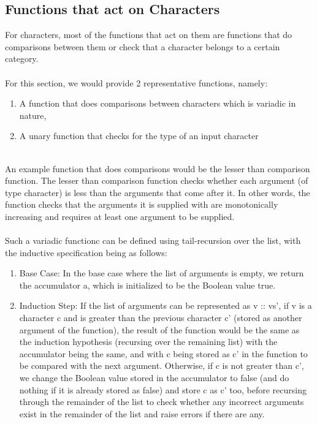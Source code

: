 \subsection{Functions that act on Characters}
For characters, most of the functions that act on them are functions that do comparisons between them or check that a character belongs to a certain category. 
\\
\\
For this section, we would provide 2 representative functions, namely:
\begin{enumerate}
   \item A function that does comparisons between characters which is variadic in nature,
   \item A unary function that checks for the type of an input character
\end{enumerate}
\\
An example function that does comparisons would be the lesser than comparison function. The lesser than comparison function checks whether each argument (of type character) is less than the arguments that come after it. 
In other words, the function checks that the arguments it is supplied with are monotonically increasing and requires at least one argument to be supplied.
\\
\\
Such a variadic functionc can be defined using tail-recursion over the list, with the inductive specification being as follows:
\begin{enumerate}
   \item Base Case: In the base case where the list of arguments is empty, we return the accumulator a, which is initialized to be the Boolean value true.
   \item Induction Step: If the list of arguments can be represented as v :: vs’, if v is a character c and is greater than the previous character c’ (stored as another argument of the function), the result of 
   the function would be the same as the induction hypothesis (recursing over the remaining list) with the accumulator being the same, and with c being stored as c’ in the function to be compared with the next 
   argument. Otherwise, if c is not greater than c’, we change the Boolean value stored in the accumulator to false (and do nothing if it is already stored as false) and store c as c’ too, before recursing through 
   the remainder of the list to check whether any incorrect arguments exist in the remainder of the list and raise errors if there are any.
\end{enumerate}
